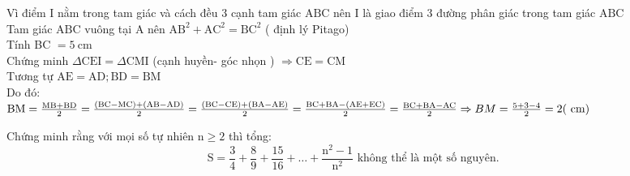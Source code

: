 \begin{bt}
{\begin{enumerate}[1.]
            Vì điểm I nằm trong tam giác và cách đều 3 cạnh tam giác $\mathrm{ABC}$ nên I là giao điểm 3 đường phân giác trong tam giác $\mathrm{ABC}$\\[5px]
            Tam giác $\mathrm{ABC}$ vuông tại $\mathrm{A}$ nên $\mathrm{AB}^2+\mathrm{AC}^2=\mathrm{BC}^2$ ( định lý Pitago)\\[5px]
            Tính BC $=5 \mathrm{~cm}$\\[5px]
            Chứng minh $\Delta \mathrm{CEI}=\Delta \mathrm{CMI}$ (cạnh huyền- góc nhọn ) $\Rightarrow \mathrm{CE}=\mathrm{CM}$\\[5px]
            Tương tự $\mathrm{AE}=\mathrm{AD} ; \mathrm{BD}=\mathrm{BM}$\\[5px]
            Do đó:\\[5px] 
            $\mathrm{BM}=\frac{\mathrm{MB}+\mathrm{BD}}{2}=\frac{(\mathrm{BC}-\mathrm{MC})+(\mathrm{AB}-\mathrm{AD})}{2}=\frac{(\mathrm{BC}-\mathrm{CE})+(\mathrm{BA}-\mathrm{AE})}{2} \\[5px]
            =\frac{\mathrm{BC}+\mathrm{BA}-(\mathrm{AE}+\mathrm{EC})}{2}=\frac{\mathrm{BC}+\mathrm{BA}-\mathrm{AC}}{2} \\[5px]
            \Rightarrow B M=\frac{5+3-4}{2}=2(\mathrm{~cm})$
        \end{enumerate}
    }
\end{bt}

\begin{bt}
    Chứng minh rằng với mọi số tự nhiên $\mathrm{n} \geq 2$ thì tổng:
    $$
    \mathrm{S}=\frac{3}{4}+\frac{8}{9}+\frac{15}{16}+\ldots+\frac{\mathrm{n}^2-1}{\mathrm{n}^2} \text { không thể là một số nguyên. }
    $$
\end{bt}



